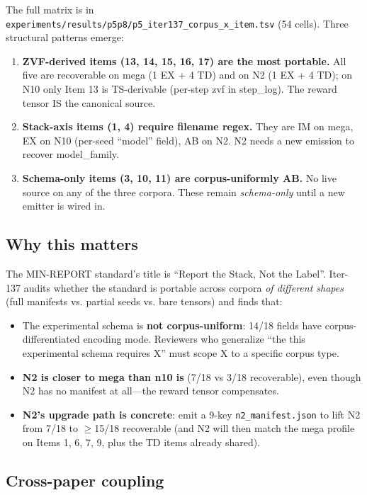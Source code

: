 The full matrix is in
\texttt{experiments/results/p5p8/p5\_iter137\_corpus\_x\_item.tsv} (54 cells).
Three structural patterns emerge:

\begin{enumerate}
  \item \textbf{ZVF-derived items (13, 14, 15, 16, 17) are the most
    portable.} All five are recoverable on mega (1 EX + 4 TD) and on N2
    (1 EX + 4 TD); on N10 only Item 13 is TS-derivable (per-step zvf in
    step\_log). The reward tensor IS the canonical source.
  \item \textbf{Stack-axis items (1, 4) require filename regex.} They are
    IM on mega, EX on N10 (per-seed ``model'' field), AB on N2. N2 needs a
    new emission to recover model\_family.
  \item \textbf{Schema-only items (3, 10, 11) are corpus-uniformly AB.}
    No live source on any of the three corpora. These remain
    \emph{schema-only} until a new emitter is wired in.
\end{enumerate}

\subsection*{Why this matters}

The MIN-REPORT standard's title is ``Report the Stack, Not the Label''.
Iter-137 audits whether the standard is portable across corpora \emph{of
different shapes} (full manifests vs. partial seeds vs. bare tensors) and
finds that:

\begin{itemize}
  \item The experimental schema is \textbf{not corpus-uniform}: 14/18 fields have
    corpus-differentiated encoding mode. Reviewers who generalize ``the
    this experimental schema requires X'' must scope X to a specific corpus
    type.
  \item \textbf{N2 is closer to mega than n10 is} (7/18 vs 3/18 recoverable),
    even though N2 has no manifest at all---the reward tensor compensates.
  \item \textbf{N2's upgrade path is concrete}: emit a 9-key
    \texttt{n2\_manifest.json} to lift N2 from 7/18 to $\geq$15/18
    recoverable (and N2 will then match the mega profile on Items 1, 6, 7,
    9, plus the TD items already shared).
\end{itemize}

\subsection*{Cross-paper coupling}

